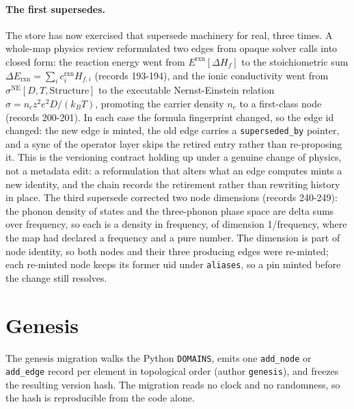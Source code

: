 \documentclass[11pt,a4paper]{article}
\begin{document}
\paragraph{The first supersedes.} The store has now exercised that supersede
machinery for real, three times. A whole-map physics review reformulated two edges from
opaque solver calls into closed form: the reaction energy went from
$E^{\mathrm{rxn}}[\Delta H_f]$ to the stoichiometric sum
$\Delta E_{\mathrm{rxn}} = \sum_i c^{\mathrm{rxn}}_i H_{f,i}$ (records 193-194),
and the ionic conductivity went from $\sigma^{\mathrm{NE}}[D, T, \mathrm{Structure}]$
to the executable Nernst-Einstein relation
$\sigma = n_c z^2 e^2 D / (k_B T)$, promoting the carrier density $n_c$ to a
first-class node (records 200-201). In each case the formula fingerprint changed,
so the edge id changed: the new edge is minted, the old edge carries a
\texttt{superseded\_by} pointer, and a sync of the operator layer skips the
retired entry rather than re-proposing it. This is the versioning contract holding
up under a genuine change of physics, not a metadata edit: a reformulation that
alters what an edge computes mints a new identity, and the chain records the
retirement rather than rewriting history in place. The third supersede
corrected two node dimensions (records 240-249): the phonon density of states and
the three-phonon phase space are delta sums over frequency, so each is a density in
frequency, of dimension 1/frequency, where the map had declared a frequency and a
pure number. The dimension is part of node identity, so both nodes and their three
producing edges were re-minted; each re-minted node keeps its former uid under
\texttt{aliases}, so a pin minted before the change still resolves.

\section{Genesis}
\label{sec:kernel-genesis}

The genesis migration walks the Python \texttt{DOMAINS}, emits one
\texttt{add\_node} or \texttt{add\_edge} record per element in topological order
(author \texttt{genesis}), and freezes the resulting version hash. The migration
reads no clock and no randomness, so the hash is reproducible from the code alone.
\end{document}
